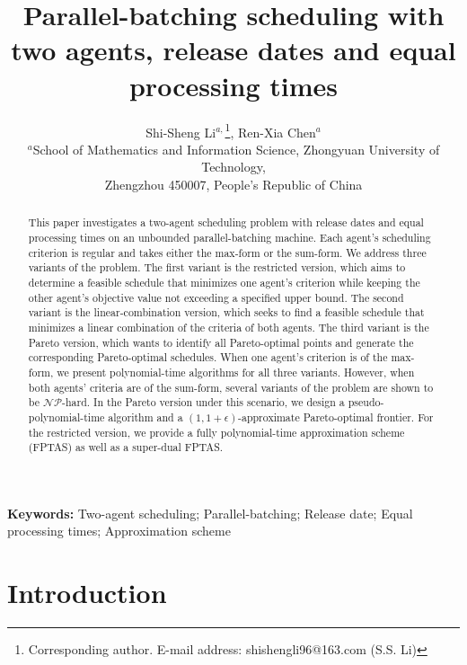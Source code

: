 \documentclass[12pt]{article}
\title{\LARGE\bf Parallel-batching scheduling with two agents, release dates and equal processing times}
\author{Shi-Sheng Li$^{a,}$\footnote{Corresponding author.
E-mail address: shishengli96@163.com (S.S. Li)}, Ren-Xia Chen$^{a}$\\
{\small $^{a}$School of Mathematics and Information Science, Zhongyuan University of Technology,}\\
{\small Zhengzhou 450007, People's Republic of China}\\}
\date{}
\begin{document}
\begin{sloppypar}

\maketitle 

\begin{abstract}	
This paper investigates a two-agent scheduling problem with release dates and equal processing times on an unbounded parallel-batching machine. Each agent’s scheduling criterion is regular and takes either the max-form or the sum-form. We address three variants of the problem. The first variant is the restricted version, which aims to determine a feasible schedule that minimizes one agent's criterion while keeping the other agent's objective value not exceeding a specified upper bound. The second variant is the linear-combination version, which seeks to find a feasible schedule that minimizes a linear combination of the criteria of both agents. The third variant is the Pareto version, which wants to identify all Pareto-optimal points and generate the corresponding Pareto-optimal schedules. When one agent's criterion is of the max-form, we present polynomial-time algorithms for all three variants. However, when both agents' criteria are of the sum-form, several variants of the problem are shown to be $\mathcal{NP}$-hard. In the Pareto version under this scenario, we design a pseudo-polynomial-time algorithm and a $(1, 1+\epsilon)$-approximate Pareto-optimal frontier. For the restricted version, we provide a fully polynomial-time approximation scheme (FPTAS) as well as a super-dual FPTAS. 
\end{abstract}

\noindent \textbf{Keywords:} Two-agent scheduling; Parallel-batching; Release date; Equal processing times; Approximation scheme

\section{Introduction}


\end{sloppypar}
\end{document}
